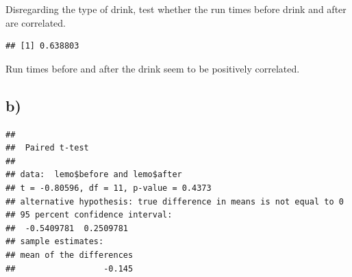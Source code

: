 \documentclass[
]{article}
\newenvironment{Shaded}{\begin{snugshade}}{\end{snugshade}}
\newcommand{\AttributeTok}[1]{\textcolor[rgb]{0.77,0.63,0.00}{#1}}
\newcommand{\CommentTok}[1]{\textcolor[rgb]{0.56,0.35,0.01}{\textit{#1}}}
\newcommand{\ConstantTok}[1]{\textcolor[rgb]{0.00,0.00,0.00}{#1}}
\newcommand{\FunctionTok}[1]{\textcolor[rgb]{0.00,0.00,0.00}{#1}}
\newcommand{\NormalTok}[1]{#1}
\newcommand{\OtherTok}[1]{\textcolor[rgb]{0.56,0.35,0.01}{#1}}
\newcommand{\SpecialCharTok}[1]{\textcolor[rgb]{0.00,0.00,0.00}{#1}}
\newcommand{\StringTok}[1]{\textcolor[rgb]{0.31,0.60,0.02}{#1}}
\begin{document}
Disregarding the type of drink, test whether the run times before drink
and after are correlated.

\begin{Shaded}
\end{Shaded}

\begin{verbatim}
## [1] 0.638803
\end{verbatim}

Run times before and after the drink seem to be positively correlated.

\hypertarget{b-2}{%
\subsection{b)}\label{b-2}}

\begin{Shaded}
\end{Shaded}

\begin{verbatim}
## 
##  Paired t-test
## 
## data:  lemo$before and lemo$after
## t = -0.80596, df = 11, p-value = 0.4373
## alternative hypothesis: true difference in means is not equal to 0
## 95 percent confidence interval:
##  -0.5409781  0.2509781
## sample estimates:
## mean of the differences 
##                  -0.145
\end{verbatim}
\end{document}

